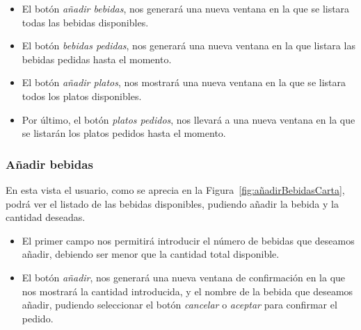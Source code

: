  \begin{itemize} 

\item El botón \textit{añadir bebidas}, nos generará una nueva ventana en la que se listara todas las bebidas disponibles.
 
\item El botón \textit{bebidas pedidas}, nos generará una nueva ventana en la que listara las bebidas pedidas hasta el momento.

\item El botón \textit{añadir platos}, nos mostrará una nueva ventana en la que se listara todos los platos disponibles.
 
\item Por último, el botón \textit{platos pedidos}, nos llevará a una nueva ventana en la que se listarán los platos pedidos hasta el momento.
\end{itemize}


\subsubsection*{Añadir bebidas}
 En esta vista el usuario, como se aprecia en la Figura~\ref{fig:añadirBebidasCarta}, podrá ver el listado de las bebidas disponibles, pudiendo añadir la bebida y la cantidad deseadas.
 
 \begin{itemize} 

\item El primer campo nos permitirá introducir el número de bebidas que deseamos añadir, debiendo ser menor que la cantidad total disponible.

\item El botón \textit{añadir}, nos generará una nueva ventana de confirmación en la que nos mostrará la cantidad introducida, y el nombre de la bebida que deseamos añadir, pudiendo seleccionar el botón \textit{cancelar} o \textit{aceptar} para confirmar el pedido.


\end{itemize}

